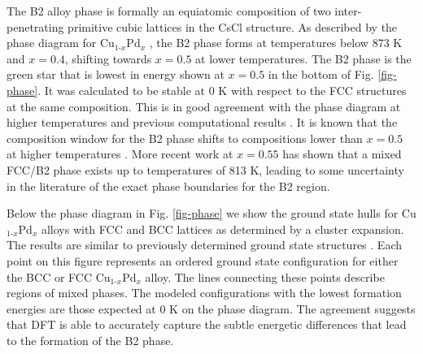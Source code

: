 \documentclass[number, sort&compress, review, 12pt]{elsarticle}
\begin{document}
The B2 alloy phase is formally an equiatomic composition of two inter-penetrating primitive cubic lattices in the CsCl structure. As described by the phase diagram for Cu$_{\text{1-}x}$Pd$_x$ \cite{subramanian-1991-cu-pd-pallad}, the B2 phase forms at temperatures below 873 K and $x = 0.4$, shifting towards $x = 0.5$ at lower temperatures. The B2 phase is the green star that is lowest in energy shown at $x = 0.5$ in the bottom of Fig. \ref{fig-phase}. It was calculated to be stable at 0 K with respect to the FCC structures at the same composition. This is in good agreement with the phase diagram at higher temperatures and previous computational results \cite{donato-2000-bain-trans}. It is known that the composition window for the B2 phase shifts to compositions lower than $x = 0.5$ at higher temperatures \cite{bruno-2001-fermi-cu}. More recent work \cite{novikova-2014-deter-temper} at $x = 0.55$ has shown that a mixed FCC/B2 phase exists up to temperatures of 813 K, leading to some uncertainty in the literature of the exact phase boundaries for the B2 region.

Below the phase diagram in Fig. \ref{fig-phase} we show the ground state hulls for Cu$_{\text{1-}x}$Pd$_x$ alloys with FCC and BCC lattices as determined by a cluster expansion. The results are similar to previously determined ground state structures \cite{walle-2002-autom,barthlein-2007-reint-cu}. Each point on this figure represents an ordered ground state configuration for either the BCC or FCC Cu$_{\text{1-}x}$Pd$_x$ alloy. The lines connecting these points describe regions of mixed phases. The modeled configurations with the lowest formation energies are those expected at 0 K on the phase diagram. The agreement suggests that DFT is able to accurately capture the subtle energetic differences that lead to the formation of the B2 phase.
\end{document}
